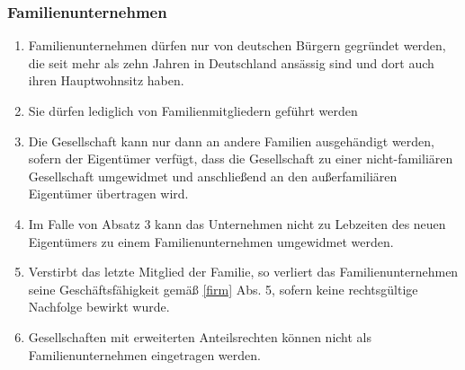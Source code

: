 \documentclass{article}
\begin{document}
\subsubsection{Familienunternehmen}\label{familien}
\begin{enumerate}[(1)]
    \item Familienunternehmen dürfen nur von deutschen Bürgern gegründet werden, die seit mehr als zehn Jahren in Deutschland ansässig sind und dort auch ihren Hauptwohnsitz haben.
    \item Sie dürfen lediglich von Familienmitgliedern geführt werden
    \item Die Gesellschaft kann nur dann an andere Familien ausgehändigt werden, sofern der Eigentümer verfügt, dass die Gesellschaft zu einer nicht-familiären Gesellschaft umgewidmet und anschließend an den außerfamiliären Eigentümer übertragen wird.
    \item Im Falle von Absatz 3 kann das Unternehmen nicht zu Lebzeiten des neuen Eigentümers zu einem Familienunternehmen umgewidmet werden.
    \item Verstirbt das letzte Mitglied der Familie, so verliert das Familienunternehmen seine Geschäftsfähigkeit gemäß \ref{firm} Abs. 5, sofern keine rechtsgültige Nachfolge bewirkt wurde.
    \item Gesellschaften mit erweiterten Anteilsrechten können nicht als Familienunternehmen eingetragen werden.
\end{enumerate}
\end{document}
